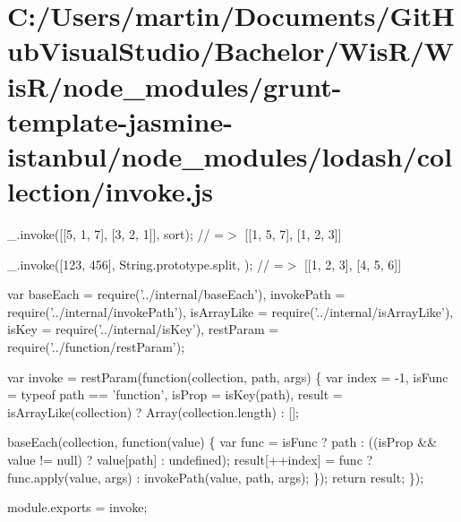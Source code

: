 \hypertarget{_c_1_2_users_2martin_2_documents_2_git_hub_visual_studio_2_bachelor_2_wis_r_2_wis_r_2node_module914b3952031e205e0056087a30765cb4}{}\section{C\+:/\+Users/martin/\+Documents/\+Git\+Hub\+Visual\+Studio/\+Bachelor/\+Wis\+R/\+Wis\+R/node\+\_\+modules/grunt-\/template-\/jasmine-\/istanbul/node\+\_\+modules/lodash/collection/invoke.\+js}
\+\_\+.\+invoke(\mbox{[}\mbox{[}5, 1, 7\mbox{]}, \mbox{[}3, 2, 1\mbox{]}\mbox{]}, \textquotesingle{}sort\textquotesingle{}); // =$>$ \mbox{[}\mbox{[}1, 5, 7\mbox{]}, \mbox{[}1, 2, 3\mbox{]}\mbox{]}

\+\_\+.\+invoke(\mbox{[}123, 456\mbox{]}, String.\+prototype.\+split, \textquotesingle{}\textquotesingle{}); // =$>$ \mbox{[}\mbox{[}\textquotesingle{}1\textquotesingle{}, \textquotesingle{}2\textquotesingle{}, \textquotesingle{}3\textquotesingle{}\mbox{]}, \mbox{[}\textquotesingle{}4\textquotesingle{}, \textquotesingle{}5\textquotesingle{}, \textquotesingle{}6\textquotesingle{}\mbox{]}\mbox{]}


\begin{DoxyCodeInclude}
var baseEach = require(\textcolor{stringliteral}{'../internal/baseEach'}),
    invokePath = require(\textcolor{stringliteral}{'../internal/invokePath'}),
    isArrayLike = require(\textcolor{stringliteral}{'../internal/isArrayLike'}),
    isKey = require(\textcolor{stringliteral}{'../internal/isKey'}),
    restParam = require(\textcolor{stringliteral}{'../function/restParam'});

var invoke = restParam(\textcolor{keyword}{function}(collection, path, args) \{
  var index = -1,
      isFunc = typeof path == \textcolor{stringliteral}{'function'},
      isProp = isKey(path),
      result = isArrayLike(collection) ? Array(collection.length) : [];

  baseEach(collection, \textcolor{keyword}{function}(value) \{
    var func = isFunc ? path : ((isProp && value != null) ? value[path] : undefined);
    result[++index] = func ? func.apply(value, args) : invokePath(value, path, args);
  \});
  \textcolor{keywordflow}{return} result;
\});

module.exports = invoke;
\end{DoxyCodeInclude}
 